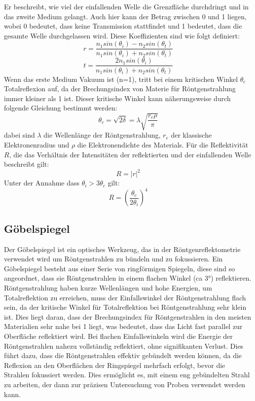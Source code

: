 Er beschreibt, wie viel der einfallenden Welle die Grenzfläche durchdringt und in das zweite Medium gelangt. Auch hier kann der Betrag 
zwischen 0 und 1 liegen, wobei 0 bedeutet, dass keine Transmission stattfindet und 1 bedeutet, dass die gesamte Welle durchgelassen wird.
Diese Koeffizienten sind wie folgt definiert:
\begin{equation}
    r=\frac{n_1sin(\theta_i)-n_2sin(\theta_t)}{n_1sin(\theta_i)+n_2sin(\theta_t)}
\end{equation}
\begin{equation}
    t=\frac{2n_1sin(\theta_i)}{n_1sin(\theta_i)+n_2sin(\theta_t)} 
\end{equation}
Wenn das erste Medium Vakuum ist (n=1), tritt bei einem kritischen Winkel $\theta_c$ Totalreflexion auf, da der Brechungsindex von Materie für
Röntgenstrahlung immer kleiner als 1 ist. Dieser kritische Winkel kann näherungsweise durch folgende Gleichung bestimmt werden:
\begin{equation}
    \theta_c = \sqrt{2\delta} = \lambda \sqrt{\frac{r_e \rho}{\pi}}
\end{equation}    
dabei sind $\lambda$ die Wellenlänge der Röntgenstrahlung, \(r_e\) der klassische Elektronenradius und $\rho$ die Elektronendichte des Materials.
Für die Reflektivität \(R\), die das Verhältnis der Intensitäten der reflektierten und der einfallenden Welle beschreibt gilt:
\begin{equation}
    R=|r|^2
\end{equation}
Unter der Annahme dass $\theta_i>3\theta_c$ gilt:
\begin{equation}
    R=(\frac{\theta_c}{2\theta_i})^4
\end{equation}   

\subsection{Göbelspiegel}
Der Göbelspiegel ist ein optisches Werkzeug, das in der  Röntgenreflektometrie verwendet wird um Röntgenstrahlen 
zu bündeln und zu fokussieren. Ein Göbelspiegel besteht aus einer Serie von ringförmigen Spiegeln, diese sind so angeordnet,
dass sie Röntgenstrahlen in einem flachen Winkel (ca 3°) reflektieren. Röntgenstrahlung haben kurze Wellenlängen und hohe Energien,
um Totalreflektion zu erreichen, muss der Einfallswinkel der Röntgenstrahlung flach sein, da der kritische Winkel für Totalreflektion
bei Röntgenstrahlung sehr klein ist. Dies liegt daran, dass der Brechungsindex für Röntgenstrahlen in den meisten Materialien sehr
nahe bei 1 liegt, was bedeutet, dass das Licht fast parallel zur Oberfläche reflektiert wird. Bei flachen Einfallswinkeln wird die Energie
der Röntgenstrahlen nahezu vollständig reflektiert, ohne signifikanten Verlust. Dies führt dazu, dass die Röntgenstrahlen effektiv gebündelt 
werden können, da die Reflexion an den Oberflächen der Ringspiegel mehrfach erfolgt, bevor die Strahlen fokussiert werden. Dies ermöglicht es,
mit einem eng gebündelten Strahl zu arbeiten, der dann zur präzisen Untersuchung von Proben verwendet werden kann.

